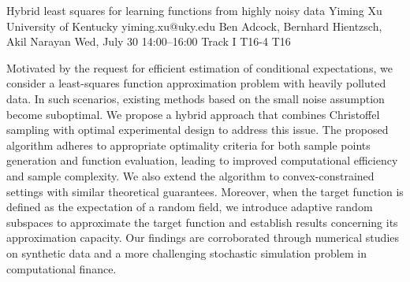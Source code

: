 \begin{talk}
  {Hybrid least squares for learning functions from highly noisy data}%
  {Yiming Xu}%
  {University of Kentucky}%
  {yiming.xu@uky.edu}%
  {Ben Adcock, Bernhard Hientzsch, Akil Narayan}%
  {}%
  {Wed, July 30 14:00–16:00 Track I}%
  {T16-4}%
  {T16}%
			
Motivated by the request for efficient estimation of conditional expectations, we consider a least-squares function approximation problem with heavily polluted data. In such scenarios, existing methods based on the small noise assumption become suboptimal. We propose a hybrid approach that combines Christoffel sampling with optimal experimental design to address this issue. The proposed algorithm adheres to appropriate optimality criteria for both sample points generation and function evaluation, leading to improved computational efficiency and sample complexity. We also extend the algorithm to convex-constrained settings with similar theoretical guarantees. Moreover, when the target function is defined as the expectation of a random field, we introduce adaptive random subspaces to approximate the target function and establish results concerning its approximation capacity. Our findings are corroborated through numerical studies on synthetic data and a more challenging stochastic simulation problem in computational finance.
\medskip

\end{talk}